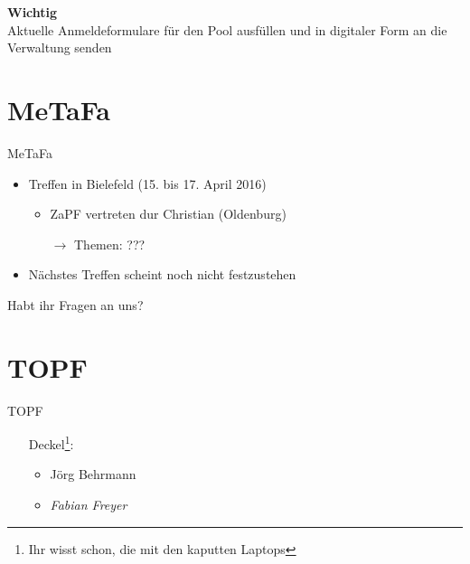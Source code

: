 \documentclass[compress,]{beamer}
\begin{document}
\begin{frame}
	\begin{framed}
		\begin{center}
			{\Huge \textbf{Wichtig}}\\
			\vspace{0.5cm}
			{\Large Aktuelle Anmeldeformulare für den Pool ausfüllen und in digitaler Form an die Verwaltung senden}
		\end{center}
	\end{framed}
\end{frame}

\section{MeTaFa}

\begin{frame}{MeTaFa}
	\begin{itemize}
		\item Treffen in Bielefeld (15. bis 17. April 2016)
			\begin{itemize}
				\item ZaPF vertreten dur Christian (Oldenburg)
				\item[$\rightarrow$] Themen: ???
			\end{itemize}
		\item Nächstes Treffen scheint noch nicht festzustehen
	\end{itemize}
\end{frame}

\begin{frame}[plain]
	\begin{center}
		\Huge Habt ihr Fragen an uns?
	\end{center}
\end{frame}
\section{TOPF}

\begin{frame}{TOPF}
	\begin{itemize}
		\item[] Deckel\footnote{Ihr wisst schon, die mit den kaputten Laptops}:
			\begin{itemize}
				\item Jörg Behrmann
				\item \emph{Fabian Freyer}
			\end{itemize}
	\end{itemize}
\end{frame}
\end{document}
